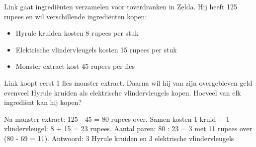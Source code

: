 \begin{opgave}
Link gaat ingrediënten verzamelen voor toverdranken in Zelda. Hij heeft 125 rupees en wil
verschillende ingrediënten kopen:

\begin{itemize}
\item Hyrule kruiden kosten 8 rupees per stuk
\item Elektrische vlindervleugels kosten 15 rupees per stuk
\item Monster extract kost 45 rupees per fles
\end{itemize}

Link koopt eerst 1 fles monster extract. Daarna wil hij van zijn overgebleven geld evenveel
Hyrule kruiden als elektrische vlindervleugels kopen. Hoeveel van elk ingrediënt kan hij
kopen?
\end{opgave}

\begin{oplossing}
Na monster extract: 125 - 45 = 80 rupees over.
Samen kosten 1 kruid + 1 vlindervleugel: 8 + 15 = 23 rupees.
Aantal paren: 80 : 23 = 3 met 11 rupees over (80 - 69 = 11).
Antwoord: 3 Hyrule kruiden en 3 elektrische vlindervleugels
\end{oplossing}